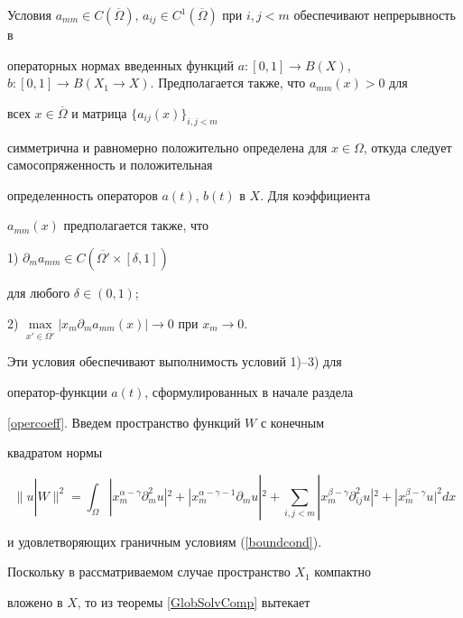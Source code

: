 Условия $a_{m m} \in C(\overline{\Omega})$, $a_{i j} \in


C^1(\overline{\Omega})$ при $i,j < m$ обеспечивают непрерывность в


операторных нормах введенных функций $a:[0,1] \to B(X)$, $b:[0,1]


\to B(X_1 \to X)$. Предполагается также, что $a_{mm}(x)>0$ для


всех $x \in \overline{\Omega}$ и матрица $\{a_{ij}(x)\}_{i,j<m}$


симметрична и равномерно положительно определена для $x \in


\Omega$, откуда следует самосопряженность и положительная


определенность операторов $a(t)$, $b(t)$ в $X$. Для коэффициента


$a_{mm}(x)$ предполагается также, что





1) $\partial_m a_{mm} \in C(\overline{\Omega'}\times [\delta,1])$


для любого $\delta \in (0,1)$;





2) $\max\limits_{x' \in \overline{\Omega'}} |x_m \partial_m


a_{mm}(x)| \to 0$ при $x_m \to 0$.





\noindent{}Эти условия обеспечивают выполнимость условий 1)--3) для


оператор-функции $a(t)$, сформулированных в начале раздела


\ref{opercoeff}. Введем пространство функций $W$ с конечным


квадратом нормы


$$


\|u|W\|^2=\int_{\Omega} |x_m^{\alpha-\gamma}


\partial_m^2 u|^2 + |x_m^{\alpha-\gamma-1}


\partial_m u|^2 + \sum_{i,j < m} |x_m^{\beta-\gamma}


\partial_{ij}^2 u|^2 + |x_m^{\beta-\gamma} u|^2 dx


$$


и удовлетворяющих граничным условиям (\ref{boundcond}).


Поскольку в рассматриваемом случае пространство $X_1$ компактно


вложено в $X$, то из теоремы \ref{GlobSolvComp} вытекает








